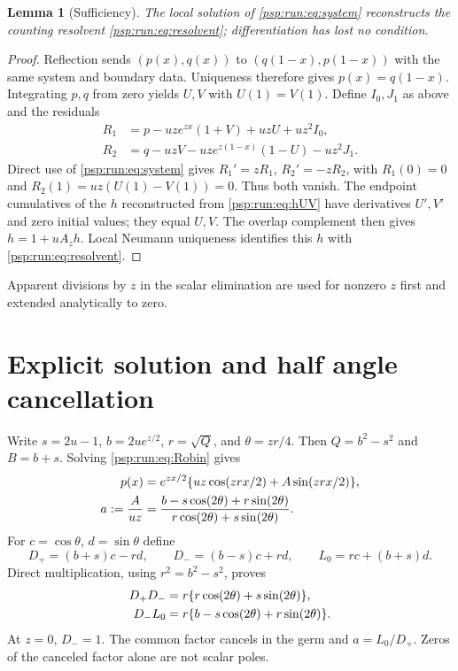 \documentclass[11pt,letterpaper]{article}
\numberwithin{equation}{section}
\newtheorem{lemma}[theorem]{Lemma}
\theoremstyle{remark}\newtheorem{remark}[theorem]{Remark}
\begin{document}
\begin{lemma}[Sufficiency]\label{psp:run:lem:sufficiency}
The local solution of \eqref{psp:run:eq:system} reconstructs the counting
resolvent \eqref{psp:run:eq:resolvent}; differentiation has lost no condition.
\end{lemma}
\begin{proof}
Reflection sends $(p(x),q(x))$ to $(q(1-x),p(1-x))$ with the same
system and boundary data. Uniqueness therefore gives $p(x)=q(1-x)$.
Integrating $p,q$ from zero yields $U,V$ with $U(1)=V(1)$.
Define $I_0,J_1$ as above and the residuals
\begin{align*}
 R_1&=p-uze^{zx}(1+V)+uzU+uz^2I_0,\\
 R_2&=q-uzV-uze^{z(1-x)}(1-U)-uz^2J_1.
\end{align*}
Direct use of \eqref{psp:run:eq:system} gives $R_1'=zR_1$, $R_2'=-zR_2$,
with $R_1(0)=0$ and $R_2(1)=uz(U(1)-V(1))=0$. Thus both vanish.
The endpoint cumulatives of the $h$ reconstructed from \eqref{psp:run:eq:hUV}
have derivatives $U',V'$ and zero initial values; they equal $U,V$.
The overlap complement then gives $h=1+uA_zh$. Local Neumann uniqueness
identifies this $h$ with \eqref{psp:run:eq:resolvent}.
\end{proof}
Apparent divisions by $z$ in the scalar elimination are used for nonzero
$z$ first and extended analytically to zero.

\section{Explicit solution and half angle cancellation}\label{psp:run:sec:cancel}
Write $s=2u-1$, $b=2ue^{z/2}$, $r=\sqrt Q$, and $\theta=zr/4$.
Then $Q=b^2-s^2$ and $B=b+s$. Solving \eqref{psp:run:eq:Robin} gives
\begin{align}
 p(x)&=e^{zx/2}\{uz\cos(zrx/2)+A\sin(zrx/2)\},\notag\\
 a:=\frac A{uz}&=
 \frac{b-s\cos(2\theta)+r\sin(2\theta)}
 {r\cos(2\theta)+s\sin(2\theta)}.\label{psp:run:eq:asolution}
\end{align}
For $c=\cos\theta$, $d=\sin\theta$ define
\[
 D_+=(b+s)c-rd,\qquad D_-=(b-s)c+rd,\qquad L_0=rc+(b+s)d.
\]
Direct multiplication, using $r^2=b^2-s^2$, proves
\begin{align}
 D_+D_-&=r\{r\cos(2\theta)+s\sin(2\theta)\},\notag\\
 D_-L_0&=r\{b-s\cos(2\theta)+r\sin(2\theta)\}.\label{psp:run:eq:cancel}
\end{align}
At $z=0$, $D_-=1$. The common factor cancels in the germ and $a=L_0/D_+$.
Zeros of the canceled factor alone are not scalar poles.
\end{document}
